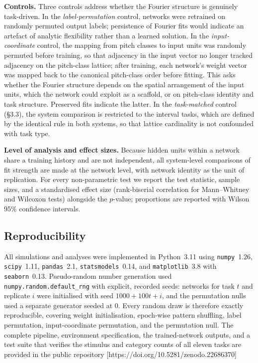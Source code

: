 \documentclass[pdflatex,sn-nature]{sn-jnl}
\newcommand{\ednote}[1]{{\color{red!70!black}\small[\textsf{#1}]}}
\begin{document}
\textbf{Controls.} Three controls address whether the Fourier structure is genuinely
task-driven. In the \emph{label-permutation} control, networks were retrained on randomly
permuted output labels; persistence of Fourier fits would indicate an artefact of analytic
flexibility rather than a learned solution. In the \emph{input-coordinate} control, the
mapping from pitch classes to input units was randomly permuted before training, so that
adjacency in the input vector no longer tracked adjacency on the pitch-class lattice;
after training, each network's weight vector was mapped back to the canonical pitch-class
order before fitting. This asks whether the Fourier structure depends on the spatial
arrangement of the input units, which the network could exploit as a scaffold, or on
pitch-class identity and task structure. Preserved fits indicate the latter. In the
\emph{task-matched} control (\S3.3), the system comparison is restricted to the interval
tasks, which are defined by the identical rule in both systems, so that lattice cardinality
is not confounded with task type.

\textbf{Level of analysis and effect sizes.} Because hidden units within a network share a
training history and are not independent, all system-level comparisons of fit strength are
made at the network level, with network identity as the unit of replication. For every
non-parametric test we report the test statistic, sample sizes, and a standardised effect
size (rank-biserial correlation for Mann--Whitney and Wilcoxon tests) alongside the
$p$-value; proportions are reported with Wilson 95\% confidence intervals.

\subsection{Reproducibility}
All simulations and analyses were implemented in Python~3.11 using \texttt{numpy}~1.26,
\texttt{scipy}~1.11, \texttt{pandas}~2.1, \texttt{statsmodels}~0.14, and
\texttt{matplotlib}~3.8 with \texttt{seaborn}~0.13. Pseudo-random number generation used
\texttt{numpy.random.default\_rng} with explicit, recorded seeds: networks for task $t$ and
replicate $i$ were initialised with seed $1000 + 100t + i$, and the permutation nulls used
a separate generator seeded at 0. Every random draw is therefore exactly reproducible, covering weight
initialisation, epoch-wise pattern shuffling, label permutation, input-coordinate
permutation, and the permutation null. The complete pipeline, environment
specification, the trained-network outputs, and a test suite that verifies the stimulus and
category counts of all eleven tasks are provided in the public repository
\ednote{https://doi.org/10.5281/zenodo.22686370}
\end{document}
